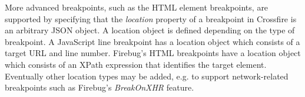 More advanced breakpoints, such as the HTML element breakpoints, are supported
by specifying that the \textit{location} property of a breakpoint in Crossfire
is an arbitrary JSON object. A location object is defined depending on
the type of breakpoint.  A JavaScript line breakpoint has a location object
which consists of a target URL and line number. Firebug's HTML breakpoints have
a location object which consists of an XPath expression that identifies the
target element.  Eventually other location types may be added, e.g. to support
network-related breakpoints such as Firebug's \textit{BreakOnXHR} feature.
